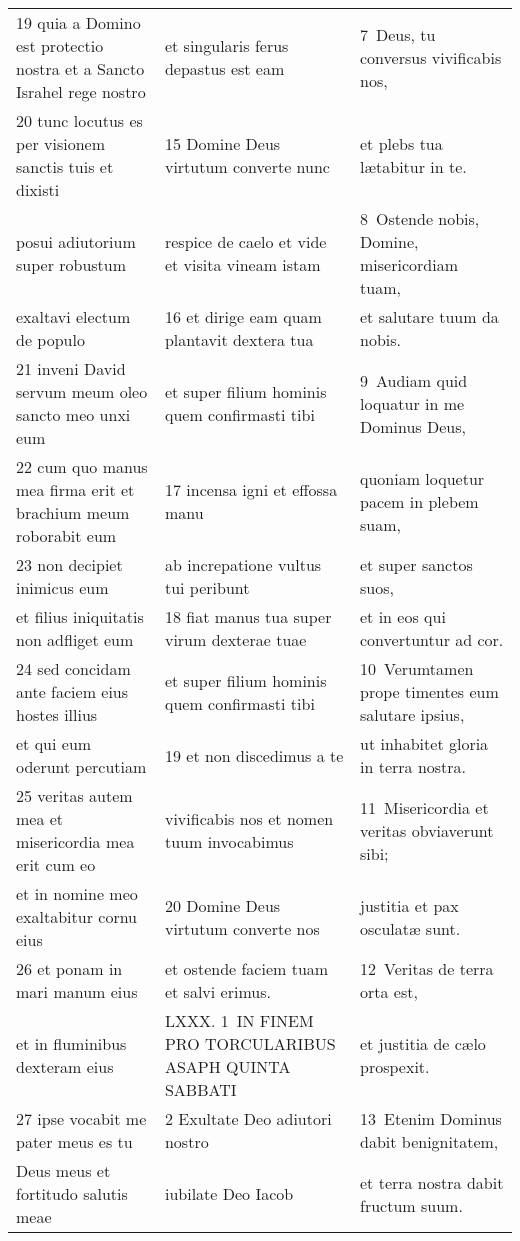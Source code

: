 \documentclass{article}
\begin{document}
\begin{longtable}{@{}p{}p{}p{}@{}}
19 quia a Domino est protectio nostra et a Sancto Israhel rege nostro	&	et singularis ferus depastus est eam	&	7 Deus, tu conversus vivificabis nos,	\\
20 tunc locutus es per visionem sanctis tuis et dixisti	&	15 Domine Deus virtutum converte nunc	&	et plebs tua lætabitur in te.	\\
posui adiutorium super robustum	&	respice de caelo et vide et visita vineam istam	&	8 Ostende nobis, Domine, misericordiam tuam,	\\
exaltavi electum de populo	&	16 et dirige eam quam plantavit dextera tua	&	et salutare tuum da nobis.	\\
21 inveni David servum meum oleo sancto meo unxi eum	&	et super filium hominis quem confirmasti tibi	&	9 Audiam quid loquatur in me Dominus Deus,	\\
22 cum quo manus mea firma erit et brachium meum roborabit eum	&	17 incensa igni et effossa manu	&	quoniam loquetur pacem in plebem suam,	\\
23 non decipiet inimicus eum	&	ab increpatione vultus tui peribunt	&	et super sanctos suos,	\\
et filius iniquitatis non adfliget eum	&	18 fiat manus tua super virum dexterae tuae	&	et in eos qui convertuntur ad cor.	\\
24 sed concidam ante faciem eius hostes illius	&	et super filium hominis quem confirmasti tibi	&	10 Verumtamen prope timentes eum salutare ipsius,	\\
et qui eum oderunt percutiam	&	19 et non discedimus a te	&	ut inhabitet gloria in terra nostra.	\\
25 veritas autem mea et misericordia mea erit cum eo	&	vivificabis nos et nomen tuum invocabimus	&	11 Misericordia et veritas obviaverunt sibi;	\\
et in nomine meo exaltabitur cornu eius	&	20 Domine Deus virtutum converte nos	&	justitia et pax osculatæ sunt.	\\
26 et ponam in mari manum eius	&	et ostende faciem tuam et salvi erimus.	&	12 Veritas de terra orta est,	\\
et in fluminibus dexteram eius	&	LXXX. 1 IN FINEM PRO TORCULARIBUS ASAPH QUINTA SABBATI	&	et justitia de cælo prospexit.	\\
27 ipse vocabit me pater meus es tu	&	2 Exultate Deo adiutori nostro	&	13 Etenim Dominus dabit benignitatem,	\\
Deus meus et fortitudo salutis meae	&	iubilate Deo Iacob	&	et terra nostra dabit fructum suum.	\\

\end{longtable}
\end{document}
